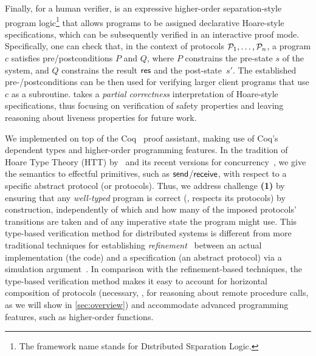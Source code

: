 Finally, for a human verifier, \disel is an expressive higher-order
separation-style program logic\footnote{The framework name stands for
  \textsc{Di}stributed \textsc{Se}paration \textsc{L}ogic.} that
allows programs to be assigned declarative Hoare-style specifications,
which can be subsequently verified in an interactive proof
mode. Specifically, one can check that, in the context of protocols
$\mathcal{P}_1, \ldots, \mathcal{P}_n$, a program $c$ satisfies pre/postconditions
$P$ and $Q$, where $P$ constrains the pre-state $s$ of the system, and
$Q$ constrains the result $\mathsf{res}$ and the post-state~$s'$.
%
%
The established pre-/postconditions can be then used for verifying
larger client programs that use $c$ as a subroutine.
%
\disel takes a \emph{partial correctness} interpretation of
Hoare-style specifications, thus focusing on verification of safety
properties and leaving reasoning about liveness properties for future
work.

We implemented \disel on top of the Coq~\cite{Coq} proof
assistant, making use of Coq's dependent types and higher-order
programming features. In the tradition of Hoare Type Theory (HTT)
by~\citet{Nanevski-al:ICFP06,nanevski:ynot,Nanevski-al:POPL10}
and its recent versions for
concurrency~\cite{LeyWild-Nanevski:POPL13,Nanevski-al:ESOP14}, we give
the semantics to effectful primitives, such as $\mathsf{send}$/$\mathsf{receive}$,
with respect to a specific abstract protocol (or protocols).
%
Thus, we address challenge \textbf{(1)} by ensuring that any
\emph{well-typed} program is correct (\ie, respects its protocols) by
construction, independently of which and how many of the imposed
protocols' transitions are taken and of any imperative state the
program might use.
This type-based verification method for distributed systems is
different from more traditional techniques for establishing
\emph{refinement}~\cite{Abadi-Lamport:LICS88,Hawblitzel-al:SOSP15}
between an actual implementation (the code) and a specification (an
abstract protocol) via a simulation
argument~\cite{Lynch-Vaandrager:IC95}.
%
In comparison with the refinement-based techniques, the type-based
verification method makes it easy to account for horizontal
composition of protocols (necessary, \eg, for reasoning about remote
procedure calls, as we will show in \cref{sec:overview}) and
accommodate advanced programming features, such as higher-order
functions.

